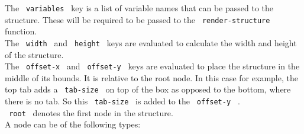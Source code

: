 The \texttt{\ variables\ } key is a list of variable names that can be
passed to the structure. These will be required to be passed to the
\texttt{\ render-structure\ } function.\\
The \texttt{\ width\ } and \texttt{\ height\ } keys are evaluated to
calculate the width and height of the structure.\\
The \texttt{\ offset-x\ } and \texttt{\ offset-y\ } keys are evaluated
to place the structure in the middle of its bounds. It is relative to
the root node. In this case for example, the top tab adds a
\texttt{\ tab-size\ } on top of the box as opposed to the bottom, where
there is no tab. So this \texttt{\ tab-size\ } is added to the
\texttt{\ offset-y\ } .\\
\texttt{\ root\ } denotes the first node in the structure.\\
A node can be of the following types:

